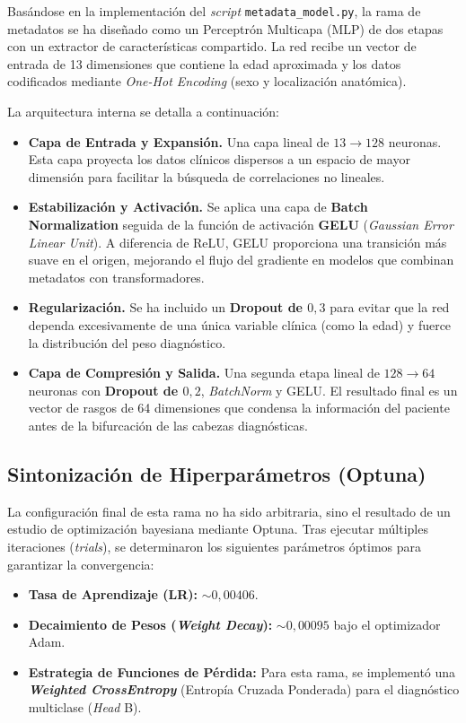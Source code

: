 Basándose en la implementación del \textit{script} \texttt{metadata\_model.py}, la rama de metadatos se ha diseñado como un Perceptrón Multicapa (MLP) de dos etapas con un extractor de características compartido. La red recibe un vector de entrada de 13 dimensiones que contiene la edad aproximada y los datos codificados mediante \textit{One-Hot Encoding} (sexo y localización anatómica).

La arquitectura interna se detalla a continuación:

\begin{itemize}
	\item \textbf{Capa de Entrada y Expansión.} Una capa lineal de $13 \to 128$ neuronas. Esta capa proyecta los datos clínicos dispersos a un espacio de mayor dimensión para facilitar la búsqueda de correlaciones no lineales.
	\item \textbf{Estabilización y Activación.} Se aplica una capa de \textbf{Batch Normalization} seguida de la función de activación \textbf{GELU} (\textit{Gaussian Error Linear Unit}). A diferencia de ReLU, GELU proporciona una transición más suave en el origen, mejorando el flujo del gradiente en modelos que combinan metadatos con transformadores.
	\item \textbf{Regularización.} Se ha incluido un \textbf{Dropout de $0,3$} para evitar que la red dependa excesivamente de una única variable clínica (como la edad) y fuerce la distribución del peso diagnóstico.
	\item \textbf{Capa de Compresión y Salida.} Una segunda etapa lineal de $128 \to 64$ neuronas con \textbf{Dropout de $0,2$}, \textit{BatchNorm} y GELU. El resultado final es un vector de rasgos de 64 dimensiones que condensa la información del paciente antes de la bifurcación de las cabezas diagnósticas.
\end{itemize}

\subsection{Sintonización de Hiperparámetros (Optuna)}

La configuración final de esta rama no ha sido arbitraria, sino el resultado de un estudio de optimización bayesiana mediante Optuna. Tras ejecutar múltiples iteraciones (\textit{trials}), se determinaron los siguientes parámetros óptimos para garantizar la convergencia:

\begin{itemize}
	\item \textbf{Tasa de Aprendizaje (LR):} $\sim 0,00406$.
	\item \textbf{Decaimiento de Pesos (\textit{Weight Decay}):} $\sim 0,00095$ bajo el optimizador Adam.
	\item \textbf{Estrategia de Funciones de Pérdida:} Para esta rama, se implementó una \textbf{\textit{Weighted CrossEntropy}} (Entropía Cruzada Ponderada) para el diagnóstico multiclase (\textit{Head} B).
\end{itemize}

